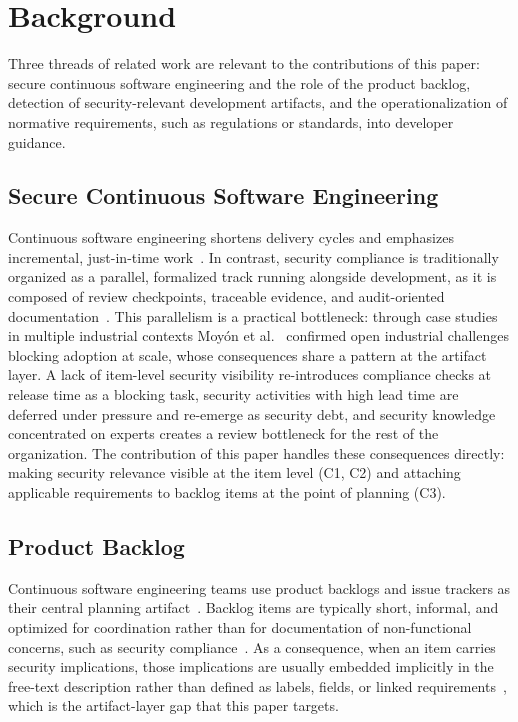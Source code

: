 \section{Background}

Three threads of related work are relevant to the contributions of this paper: secure continuous software engineering and the role of the product backlog, detection of security-relevant development artifacts, and the operationalization of normative requirements, such as regulations or standards, into developer guidance.

\subsection{Secure Continuous Software Engineering}

Continuous software engineering shortens delivery cycles and emphasizes incremental, just-in-time work~\cite{fitzgerald2017continuous}.
In contrast, security compliance is traditionally organized as a parallel, formalized track running alongside development, as it is composed of review checkpoints, traceable evidence, and audit-oriented documentation~\cite{moyon2018towardcsc, angermeir2024automatedcsc}.
This parallelism is a practical bottleneck: through case studies in multiple industrial contexts Moyón et al.~\cite{moyon2024challenges} confirmed open industrial challenges blocking adoption at scale, whose consequences share a pattern at the artifact layer.
A lack of item-level security visibility re-introduces compliance checks at release time as a blocking task, security 
activities with high lead time are deferred under pressure and re-emerge as 
security debt, and security knowledge concentrated on experts creates a review 
bottleneck for the rest of the organization.
The contribution of this paper handles these consequences directly: making security relevance visible at the item level (C1, C2) and attaching applicable requirements to backlog items at the point of planning (C3).

\subsection{Product Backlog}

Continuous software engineering teams use product backlogs and issue trackers as their central planning artifact~\cite{iso2018sse}.
Backlog items are typically short, informal, and optimized for coordination rather than for documentation of non-functional concerns, such as security compliance~\cite{ferreira2022writing-agile-requirements}.
As a consequence, when an item carries security implications, those implications are usually embedded implicitly in the free-text description rather than defined as labels, fields, or linked requirements~\cite{raharjana2021user-stories-nlp}, which is the artifact-layer gap that this paper targets.

